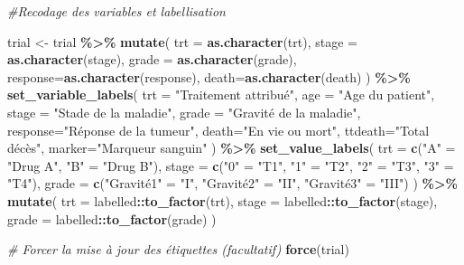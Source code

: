 \documentclass[
]{article}
\newenvironment{Shaded}{\begin{snugshade}}{\end{snugshade}}
\newcommand{\AttributeTok}[1]{\textcolor[rgb]{0.13,0.29,0.53}{#1}}
\newcommand{\CommentTok}[1]{\textcolor[rgb]{0.56,0.35,0.01}{\textit{#1}}}
\newcommand{\FunctionTok}[1]{\textcolor[rgb]{0.13,0.29,0.53}{\textbf{#1}}}
\newcommand{\NormalTok}[1]{#1}
\newcommand{\OtherTok}[1]{\textcolor[rgb]{0.56,0.35,0.01}{#1}}
\newcommand{\SpecialCharTok}[1]{\textcolor[rgb]{0.81,0.36,0.00}{\textbf{#1}}}
\newcommand{\StringTok}[1]{\textcolor[rgb]{0.31,0.60,0.02}{#1}}
\begin{document}
\begin{Shaded}
\begin{Highlighting}[]
\CommentTok{\#Recodage des variables et labellisation}

\NormalTok{trial }\OtherTok{\textless{}{-}}\NormalTok{ trial }\SpecialCharTok{\%\textgreater{}\%}
  \FunctionTok{mutate}\NormalTok{(}
    \AttributeTok{trt =} \FunctionTok{as.character}\NormalTok{(trt),}
    \AttributeTok{stage =} \FunctionTok{as.character}\NormalTok{(stage),}
    \AttributeTok{grade =} \FunctionTok{as.character}\NormalTok{(grade),}
    \AttributeTok{response=}\FunctionTok{as.character}\NormalTok{(response),}
    \AttributeTok{death=}\FunctionTok{as.character}\NormalTok{(death)}
\NormalTok{  ) }\SpecialCharTok{\%\textgreater{}\%}
  \FunctionTok{set\_variable\_labels}\NormalTok{(}
    \AttributeTok{trt =} \StringTok{"Traitement attribué"}\NormalTok{,}
    \AttributeTok{age =} \StringTok{"Age du patient"}\NormalTok{,}
    \AttributeTok{stage =} \StringTok{"Stade de la maladie"}\NormalTok{,}
    \AttributeTok{grade =} \StringTok{"Gravité de la maladie"}\NormalTok{,}
    \AttributeTok{response=}\StringTok{"Réponse de la tumeur"}\NormalTok{,}
    \AttributeTok{death=}\StringTok{"En vie ou mort"}\NormalTok{,}
    \AttributeTok{ttdeath=}\StringTok{"Total décès"}\NormalTok{,}
    \AttributeTok{marker=}\StringTok{"Marqueur sanguin"}
\NormalTok{  ) }\SpecialCharTok{\%\textgreater{}\%}
  \FunctionTok{set\_value\_labels}\NormalTok{(}
    \AttributeTok{trt =} \FunctionTok{c}\NormalTok{(}\StringTok{"A"} \OtherTok{=} \StringTok{"Drug A"}\NormalTok{, }\StringTok{"B"} \OtherTok{=} \StringTok{"Drug B"}\NormalTok{),}
    \AttributeTok{stage =} \FunctionTok{c}\NormalTok{(}\StringTok{"0"} \OtherTok{=} \StringTok{"T1"}\NormalTok{, }\StringTok{"1"} \OtherTok{=} \StringTok{"T2"}\NormalTok{, }\StringTok{"2"} \OtherTok{=} \StringTok{"T3"}\NormalTok{, }\StringTok{"3"} \OtherTok{=} \StringTok{"T4"}\NormalTok{),}
    \AttributeTok{grade =} \FunctionTok{c}\NormalTok{(}\StringTok{"Gravité1"} \OtherTok{=} \StringTok{"I"}\NormalTok{, }\StringTok{"Gravité2"} \OtherTok{=} \StringTok{"II"}\NormalTok{, }\StringTok{"Gravité3"} \OtherTok{=} \StringTok{"III"}\NormalTok{)}
\NormalTok{  ) }\SpecialCharTok{\%\textgreater{}\%}
  \FunctionTok{mutate}\NormalTok{(}
    \AttributeTok{trt =}\NormalTok{ labelled}\SpecialCharTok{::}\FunctionTok{to\_factor}\NormalTok{(trt),}
    \AttributeTok{stage =}\NormalTok{ labelled}\SpecialCharTok{::}\FunctionTok{to\_factor}\NormalTok{(stage),}
    \AttributeTok{grade =}\NormalTok{ labelled}\SpecialCharTok{::}\FunctionTok{to\_factor}\NormalTok{(grade)}
\NormalTok{  )}

\CommentTok{\# Forcer la mise à jour des étiquettes (facultatif)}
\FunctionTok{force}\NormalTok{(trial)}
\end{Highlighting}
\end{Shaded}
\end{document}
